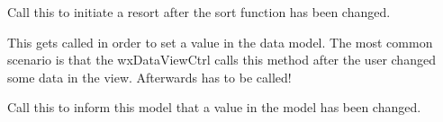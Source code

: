 
Call this to initiate a resort after the sort function has
been changed.

\label{wxdataviewmodelsetvalue}


This gets called in order to set a value in the data model.
The most common scenario is that the wxDataViewCtrl calls
this method after the user changed some data in the view.
Afterwards 
has to be called!

\label{wxdataviewmodelvaluechanged}


Call this to inform this model that a value in
the model has been changed.

